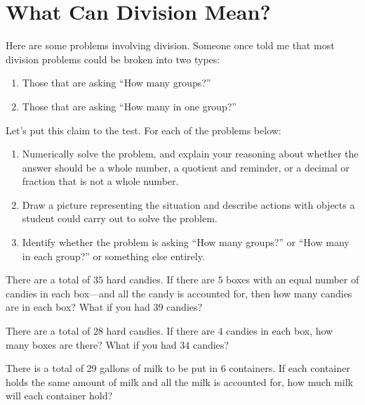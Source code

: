 \newpage
\section{What Can Division Mean?}\label{A:dm}

Here are some problems involving division. Someone once told me that
most division problems could be broken into two types:
\begin{enumerate}
\item Those that are asking ``How many groups?''
\item Those that are asking ``How many in one group?''
\end{enumerate}
Let's put this claim to the test. For each of the problems below:
\begin{enumerate}
\item Numerically solve the problem, and explain your reasoning about whether the answer should be a whole number, a quotient and reminder, or a decimal or fraction that is not a whole number.
\item Draw a picture representing the situation and describe actions with objects a student could carry out to solve the problem.
\item Identify whether the problem is asking ``How many groups?'' or ``How many in each group?'' or something else entirely.
\end{enumerate}

\begin{prob}
There are a total of $35$ hard candies. If there are $5$ boxes with an
equal number of candies in each box---and all the candy is accounted
for, then how many candies are in each box? What if you had $39$
candies?
\end{prob}

\begin{prob}
There are a total of $28$ hard candies. If there are $4$ candies in
each box, how many boxes are there? What if you had $34$ candies?
\end{prob}


\begin{prob}
There is a total of 29 gallons of milk to be put in 6 containers.  If
each container holds the same amount of milk and all the milk is
accounted for, how much milk will each container hold?
\end{prob}

